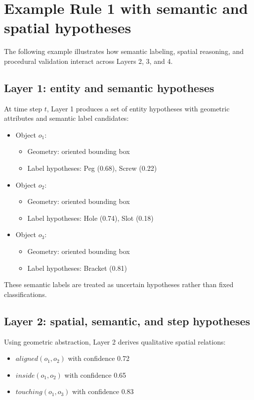 \documentclass[11pt,titlepage,openright]{book}
\begin{document}
\section{Example Rule 1 with semantic and spatial hypotheses}
\label{sec:example-rule1}

The following example illustrates how semantic labeling, spatial reasoning, and procedural validation interact across Layers 2, 3, and 4.

\subsection{Layer 1: entity and semantic hypotheses}

At time step $t$, Layer 1 produces a set of entity hypotheses with geometric attributes and semantic label candidates:

\begin{itemize}
\item Object $o_1$:
\begin{itemize}
\item Geometry: oriented bounding box
\item Label hypotheses: Peg (0.68), Screw (0.22)
\end{itemize}
\item Object $o_2$:
\begin{itemize}
\item Geometry: oriented bounding box
\item Label hypotheses: Hole (0.74), Slot (0.18)
\end{itemize}
\item Object $o_3$:
\begin{itemize}
\item Geometry: oriented bounding box
\item Label hypotheses: Bracket (0.81)
\end{itemize}
\end{itemize}

These semantic labels are treated as uncertain hypotheses rather than fixed classifications.

\subsection{Layer 2: spatial, semantic, and step hypotheses}

Using geometric abstraction, Layer 2 derives qualitative spatial relations:

\begin{itemize}
\item $aligned(o_1, o_2)$ with confidence 0.72
\item $inside(o_1, o_2)$ with confidence 0.65
\item $touching(o_1, o_3)$ with confidence 0.83
\end{itemize}
\end{document}
